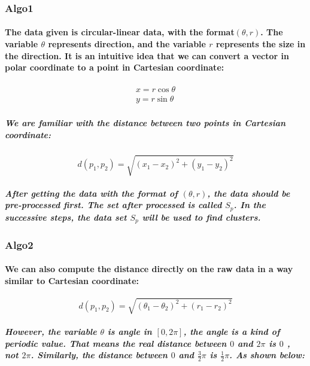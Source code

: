\documentclass{article}
\begin{document}
\subsubsection{Algo1}
\paragraph{
The data given is circular-linear data, with the format$(\theta, r)$. The variable $\theta$ represents direction, and the variable $r$ represents the size in the direction. It is an intuitive idea that we can convert a vector in polar coordinate to a point in Cartesian coordinate:
}

\begin{equation}
\begin{aligned}
x = r \cos{\theta} \\
y = r \sin {\theta}
\end{aligned}
\end{equation}

\subparagraph{
We are familiar with the distance between two points in Cartesian coordinate:
}

\begin{equation}
d(p_{1}, p_{2}) = \sqrt{(x_{1} - x_{2})^2 + ({y_1 - y_2})^2}
\end{equation}

\subparagraph{
After getting the data with the format of $(\theta,r)$, the data should be pre-processed first. The set after processed is called $S_p$. In the successive steps, the data set $S_p$ will be used to find clusters.
}

\subsubsection{Algo2}
\paragraph{
We can also compute the distance directly on the raw data in a way similar to Cartesian coordinate:
}

\begin{equation}
d(p_1, p_2) = \sqrt{({\theta_1 - \theta_2})^2 + ({r_1 - r_2})^2}
\end{equation}

\subparagraph{
However, the variable $\theta$ is angle in $[0, 2 \pi]$, the angle is a kind of periodic value. That means the real distance between $0$ and $2\pi$ is $0$ , not $2\pi$. Similarly, the distance between $0$ and $\frac{3}{2} \pi$ is $\frac{1}{2} \pi$. As shown below:
}
\end{document}
